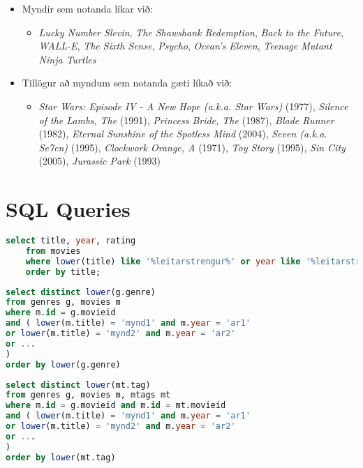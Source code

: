 \documentclass[12pt, git, draft]{rureport}
\begin{document}
\begin{itemize}
	\item Myndir sem notanda líkar við:
	\begin{itemize}
		\item \textit{Lucky Number Slevin}, \textit{The Shawshank Redemption}, \textit{Back to the Future}, \textit{WALL-E}, \textit{The Sixth Sense}, \textit{Psycho}, \textit{Ocean's Eleven}, \textit{Teenage Mutant Ninja Turtles}
	\end{itemize}
	\item Tillögur að myndum sem notanda gæti líkað við:
	\begin{itemize}
		\item \textit{Star Wars: Episode IV - A New Hope (a.k.a. Star Wars)}  (1977), \textit{Silence of the Lambs, The}  (1991), \textit{Princess Bride, The}  (1987), \textit{Blade Runner}  (1982), \textit{Eternal Sunshine of the Spotless Mind}  (2004), \textit{Seven (a.k.a. Se7en)}  (1995), \textit{Clockwork Orange, A}  (1971), \textit{Toy Story}  (1995), \textit{Sin City}  (2005), \textit{Jurassic Park}  (1993)
	\end{itemize}
\end{itemize}

\pagebreak
\appendix
\section{SQL Queries} \label{app:sql}
\begin{lstlisting}[language = SQL, caption = Finna myndir sem notanda líkar út frá leitarstreng, label=lst:Search]
	select title, year, rating
	from movies
	where lower(title) like '%leitarstrengur%' or year like '%leitarstrengur%'
	order by title;
\end{lstlisting}

\begin{lstlisting}[language = SQL, caption = Finna genres út frá titlum og ári titla, label = lst:genre]
select distinct lower(g.genre)
from genres g, movies m
where m.id = g.movieid
and ( lower(m.title) = 'mynd1' and m.year = 'ar1'
or lower(m.title) = 'mynd2' and m.year = 'ar2'
or ...
)
order by lower(g.genre)
\end{lstlisting}

\begin{lstlisting}[language = SQL, caption = Finna tags út frá titlum og ári titla, label = lst:tag]
select distinct lower(mt.tag)
from genres g, movies m, mtags mt
where m.id = g.movieid and m.id = mt.movieid
and ( lower(m.title) = 'mynd1' and m.year = 'ar1'
or lower(m.title) = 'mynd2' and m.year = 'ar2'
or ...
)
order by lower(mt.tag)
\end{lstlisting}
\end{document}
